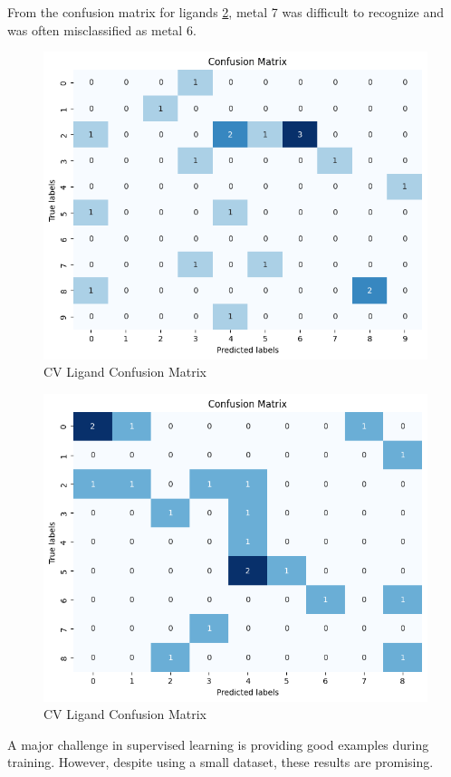 From the confusion matrix for ligands \ref{cv_ligand_matrix}, metal 7 was difficult to recognize and was often misclassified as metal 6. 
\begin{figure}[h!]
  \centering
    \includegraphics[width=1.0\textwidth]{figures/dpv_metal_matrix.png}
    \caption{CV Ligand Confusion Matrix}
    \label{cv_ligand_matrix}
\end{figure}
\begin{figure}[h!]
  \centering
    \includegraphics[width=1.0\textwidth]{figures/dpv_ligand_matrix.png}
    \caption{CV Ligand Confusion Matrix}
    \label{cv_ligand_matrix}
\end{figure}


A major challenge in supervised learning is providing good examples during training. However, despite using a small dataset, these results are promising. 
